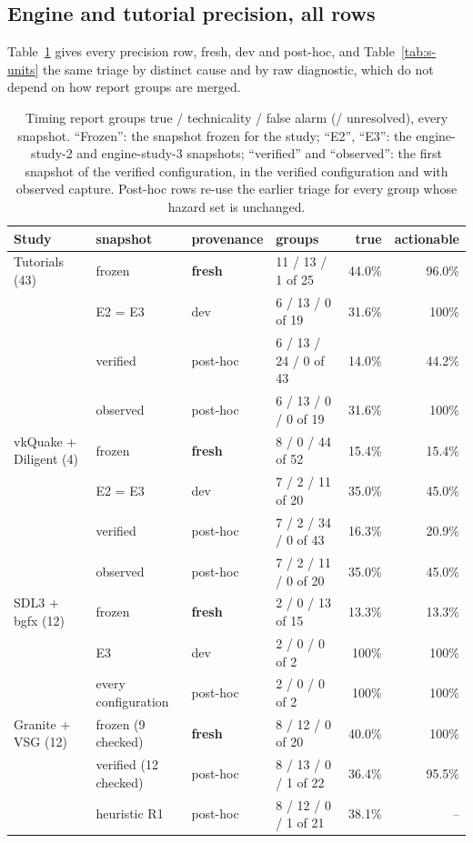 \documentclass[acmtog,anonymous,review]{acmart}
\begin{document}
\subsection{Engine and tutorial precision, all rows}
Table~\ref{tab:s-precision} gives every precision row, fresh, dev and post-hoc, and Table~\ref{tab:s-units} the same
triage by distinct cause and by raw diagnostic, which do not depend on how report groups are merged.
\begin{table}[t]
\caption{Timing report groups true / technicality / false alarm (/ unresolved), every snapshot. ``Frozen'': the snapshot
frozen for the study; ``E2'', ``E3'': the engine-study-2 and engine-study-3 snapshots; ``verified'' and ``observed'':
the first snapshot of the verified configuration, in the verified configuration and with observed capture. Post-hoc
rows re-use the earlier triage for every group whose hazard set is unchanged.}
\label{tab:s-precision}
\small
\begin{tabular}{@{}llllrr@{}}
\toprule
Study & snapshot & provenance & groups & true & actionable \\
\midrule
Tutorials (43) & frozen & \textbf{fresh} & 11 / 13 / 1 of 25 & 44.0\% & 96.0\% \\
 & E2 = E3 & dev & 6 / 13 / 0 of 19 & 31.6\% & 100\% \\
 & verified & post-hoc & 6 / 13 / 24 / 0 of 43 & 14.0\% & 44.2\% \\
 & observed & post-hoc & 6 / 13 / 0 / 0 of 19 & 31.6\% & 100\% \\
vkQuake + Diligent (4) & frozen & \textbf{fresh} & 8 / 0 / 44 of 52 & 15.4\% & 15.4\% \\
 & E2 = E3 & dev & 7 / 2 / 11 of 20 & 35.0\% & 45.0\% \\
 & verified & post-hoc & 7 / 2 / 34 / 0 of 43 & 16.3\% & 20.9\% \\
 & observed & post-hoc & 7 / 2 / 11 / 0 of 20 & 35.0\% & 45.0\% \\
SDL3 + bgfx (12) & frozen & \textbf{fresh} & 2 / 0 / 13 of 15 & 13.3\% & 13.3\% \\
 & E3 & dev & 2 / 0 / 0 of 2 & 100\% & 100\% \\
 & every configuration & post-hoc & 2 / 0 / 0 of 2 & 100\% & 100\% \\
Granite + VSG (12) & frozen (9 checked) & \textbf{fresh} & 8 / 12 / 0 of 20 & 40.0\% & 100\% \\
 & verified (12 checked) & post-hoc & 8 / 13 / 0 / 1 of 22 & 36.4\% & 95.5\% \\
 & heuristic R1 & post-hoc & 8 / 12 / 0 / 1 of 21 & 38.1\% & -- \\
\bottomrule
\end{tabular}
\end{table}
\end{document}
